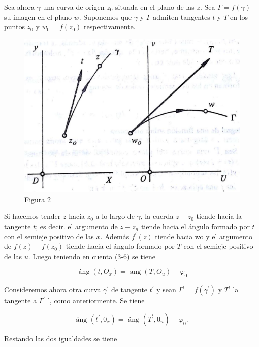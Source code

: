 \documentclass[10pt]{article}
\theoremstyle{plain}
\theoremstyle{definition}
\theoremstyle{remark}
\begin{document}
Sea ahora $\gamma$ una curva de origen $z_{0}$ situada en el plano de las $z$. Sea $\Gamma=f(\gamma)$ su imagen en el plano $w$. Suponemos que $\gamma$ y $\Gamma$ admiten tangentes $t$ y $T$ en los puntos $z_{0}$ y $w_{0}=f\left(z_{0}\right)$ respectivamente.

\begin{figure}[h]
\begin{center}
  \includegraphics[width=\textwidth]{2025_09_05_adecef5eb2053bc129b5g-020}
\captionsetup{labelformat=empty}
\caption{Figura 2}
\end{center}
\end{figure}

Si hacemos tender $z$ hacia $z_{0}$ a lo largo de $\gamma$, la cuerda $z-z_{0}$ tiende hacia la tangente $t$; es decir. el argumento de $z-z_{n}$ tiende hacia el ángulo formado por $t$ con el semieje positivo de las $x$. Además $f^{\prime}(z)$ tiende hacia wo y el argumento de $f(z)-f\left(z_{0}\right)$ tiende hacia el ángulo formado por $T$ con el semieje positivo de las $u$. Luego teniendo en cuenta (3-6) se tiene

$$
\operatorname{áng}\left(t, O_{x}\right)=\operatorname{ang}\left(T, O_{u}\right)-\varphi_{0}
$$


Consideremos ahora otra curva $\gamma^{\prime}$ de tangente $t^{\prime}$ y sean $\Gamma^{\prime}=f\left(\gamma^{\prime}\right)$ y $T^{\prime}$ la tangente a $\Gamma^{\prime}$ ', como anteriormente. Se tiene

$$
\text { áng }\left(t^{\prime}, 0_{x}\right)=\text { áng }\left(T^{\prime}, 0_{u}\right)-\varphi_{0} \text {. }
$$

Restando las dos igualdades se tiene
\end{document}
